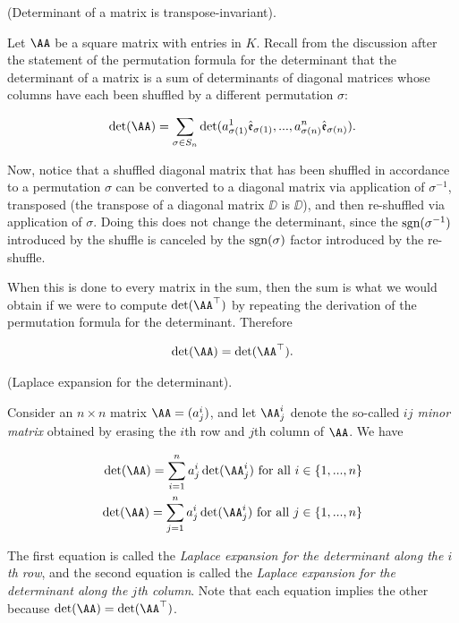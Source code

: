 \begin{deriv}
\label{ch::lin_alg::thm::det_transpose_invariant}    
    (Determinant of a matrix is transpose-invariant).
    
    Let $\AA$ be a square matrix with entries in $K$. Recall from the discussion after the statement of the permutation formula for the determinant that the determinant of a matrix is a sum of determinants of diagonal matrices whose columns have each been shuffled by a different permutation $\sigma$:
    
    \begin{align*}
        \det(\AA) = 
        \sum_{\sigma \in S_n}
        \det(a^1_{\sigma(1)} \see_{\sigma(1)}, ..., a^n_{\sigma(n)} \see_{\sigma(n)}).
    \end{align*}
    
    Now, notice that a shuffled diagonal matrix that has been shuffled in accordance to a permutation $\sigma$ can be converted to a diagonal matrix via application of $\sigma^{-1}$, transposed (the transpose of a diagonal matrix $\DD$ is $\DD$), and then re-shuffled via application of $\sigma$. Doing this does not change the determinant, since the $\text{sgn}(\sigma^{-1})$ introduced by the shuffle is canceled by the $\text{sgn}(\sigma)$ factor introduced by the re-shuffle.

    When this is done to every matrix in the sum, then the sum is what we would obtain if we were to compute $\det(\AA^\top)$ by repeating the derivation of the permutation formula for the determinant. Therefore
    
    \begin{align*}
        \det(\AA) = \det(\AA^\top).
    \end{align*}
\end{deriv}

\begin{theorem}
    (Laplace expansion for the determinant).
    
    Consider an $n \times n$ matrix $\AA = (a^i_j)$, and let $\AA^i_j$ denote the so-called \textit{$ij$ minor matrix} obtained by erasing the $i$th row and $j$th column of $\AA$. We have
    
    \begin{align*}
        \det(\AA) = \sum_{i = 1}^{n} a^i_j \det(\AA^i_j) \text{ for all $i \in \{1, ..., n\}$} \\
        \det(\AA) = \sum_{j = 1}^{n} a^i_j \det(\AA^i_j) \text{ for all $j \in \{1, ..., n\}$}
    \end{align*}
    
    The first equation is called the \textit{Laplace expansion for the determinant along the $i$th row}, and the second equation is called the \textit{Laplace expansion for the determinant along the $j$th column}. Note that each equation implies the other because $\det(\AA) = \det(\AA^\top)$.
\end{theorem}
    
